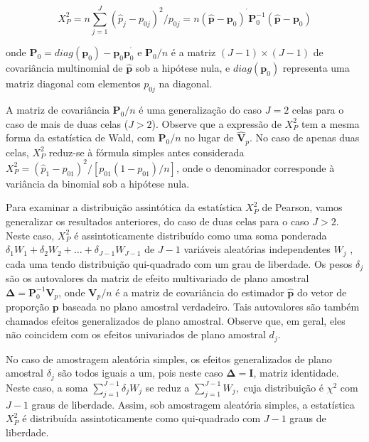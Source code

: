\documentclass[]{book}
\numberwithin{example}{chapter}
\numberwithin{remark}{chapter}
\numberwithin{definition}{chapter}
\begin{document}
\begin{equation}
X_{P}^{2}=n\sum\limits_{j=1}^{J}\left( \widehat{p}_{j}-p_{0j}\right)
^{2}/p_{0j}=n\left( \widehat{\mathbf{p}}-\mathbf{p}_{0}\right) ^{^{\prime }}
\mathbf{P}_{0}^{-1}\left( \widehat{\mathbf{p}}-\mathbf{p}_{0}\right) 
\label{eq:qual11}
\end{equation}

onde
\(\mathbf{P}_{0}=diag\left( \mathbf{p}_{0}\right) -\mathbf{p}_{0}\mathbf{p}_{0}^{^{\prime }}\)
e \(\mathbf{P}_{0}/n\) é a matriz
\(\left( J-1\right)\times \left( J-1\right)\) de covariância multinomial
de \(\widehat{\mathbf{p}}\) sob a hipótese nula, e
\(diag\left( \mathbf{p}_{0}\right)\) representa uma matriz diagonal com
elementos \(p_{0j}\) na diagonal.

A matriz de covariância \(\mathbf{P}_{0}/n\) é uma generalização do caso
\(J=2\) celas para o caso de mais de duas celas (\(J>2\)). Observe que a
expressão de \(X_{P}^{2}\) tem a mesma forma da estatística de Wald, com
\(\mathbf{P}_{0}/n\) no lugar de \(\widehat{\mathbf{V}}_{p}\). No caso
de apenas duas celas, \(X_{P}^{2}\) reduz-se à fórmula simples antes
considerada
\(X_{P}^{2}=\left( \widehat{p}_{1}-p_{01}\right) ^{2}/\left[ p_{01}\left( 1-p_{01}\right) /n\right]\),
onde o denominador corresponde à variância da binomial sob a hipótese
nula.

Para examinar a distribuição assintótica da estatística \(X_{P}^{2}\) de
Pearson, vamos generalizar os resultados anteriores, do caso de duas
celas para o caso \(J>2\). Neste caso, \(X_{P}^{2}\) é assintoticamente
distribuído como uma soma ponderada
\(\delta_{1}W_{1}+\delta _{2}W_{2}+\ldots +\delta _{J-1}W_{J-1}\) de
\(J-1\) variáveis aleatórias independentes \(W_{j}\) , cada uma tendo
distribuição qui-quadrado com um grau de liberdade. Os pesos
\(\delta _{j}\) são os autovalores da matriz de efeito multivariado de
plano amostral \(\mathbf{\Delta }=\mathbf{P}_{0}^{-1}\mathbf{V}_{p}\),
onde \(\mathbf{V}_{p}\mathbf{/}n\) é a matriz de covariância do
estimador \(\widehat{\mathbf{p}}\) do vetor de proporção \(\mathbf{p}\)
baseada no plano amostral verdadeiro. Tais autovalores são também
chamados efeitos generalizados de plano amostral. Observe que, em geral,
eles não coincidem com os efeitos univariados de plano amostral
\(d_{j}\).

No caso de amostragem aleatória simples, os efeitos generalizados de
plano amostral \(\delta_{j}\) são todos iguais a um, pois neste caso
\(\mathbf{\Delta =I}\), matriz identidade. Neste caso, a soma
\(\sum_{j=1}^{J-1}\delta _{j}W_{j}\) se reduz a
\(\sum_{j=1}^{J-1}W_{j},\) cuja distribuição é \(\chi ^{2}\) com \(J-1\)
graus de liberdade. Assim, sob amostragem aleatória simples, a
estatística \(X_{P}^{2}\) é distribuída assintoticamente como
qui-quadrado com \(J-1\) graus de liberdade.
\end{document}
